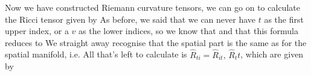 \documentclass{article}
\begin{document}
\begin{comment}	
\eq{
\hat{R}\indices{^v_j_t_l} &= \del_t \hat{\Gamma}^v_{jl} - \del_l \hat{\Gamma}^v_{jt} + \hat{\Gamma}^v_{t\mu}\hat{\Gamma}^\mu_{jl} - \hat{\Gamma}^v_{l\mu}\hat{\Gamma}^\mu_{jt} \\
&= \frac{1}{4}\del_t\psquare{\nabla\sp{(h)}_{l}N_{j}+\nabla\sp{(h)}_{j}N_{l}-h_{lj,t}} + \nabla_l \psquare{\frac12 N\sp{k} (h_{kj,t} -F_{kj}) +\Phi_{,j}} \\
&\phantom{=} +\frac{1}{2}\psquare{\nabla\sp{(h)}_{l}N_{i}+\nabla\sp{(h)}_{i}N_{l}-h_{li,t}}\psquare{F\sp{i}_{\ j} - h\sp{ik} h_{kj,t}} \\
&= \text{\hl{improve this somehow}}
}


\eq{
\hat{R}\indices{^v_t_t_l} &= \del_t \hat{\Gamma}^v_{tl} - \del_l \hat{\Gamma}^v_{tt} + \hat{\Gamma}^v_{t\mu}\hat{\Gamma}^\mu_{tl} - \hat{\Gamma}^v_{l\mu}\hat{\Gamma}^\mu_{tt} \\
&= -\del_t \psquare{\frac12 N\sp{k} (h_{kl,t} -F_{kl}) +\Phi_{,l}} - \del_l\psquare{-\Phi_{,t}+N^kF_{kt}} +\frac{1}{2} \psquare{\frac12 N\sp{k} (h_{ki,t} -F_{ki}) +\Phi_{,i}}\psquare{F\sp{i}_{\ l}- h\sp{ik} h_{kl,t}} \\
&\phantom{=} +F\indices{^i_t} \psquare{\nabla\sp{(h)}_{l}N_{i}+\nabla\sp{(h)}_{i}N_{l}-h_{li,t}}  \\
&= \text{\hl{improve this somehow}}
}
\end{comment}

Now we have constructed Riemann curvature tensors, we can go on to calculate the Ricci tensor given by 
As before, we said that we can never have $t$ as the first upper index, or a $v$ as the lower indices, so we know that 
and that this formula reduces to 
We straight away recognise that the spatial part is the same as for the spatial manifold, i.e. 
All that's left to calculate is $\hat{R}_{ti} = \hat{R}_{it}, \, \hat{R}_tt$, which are given by
\end{document}
